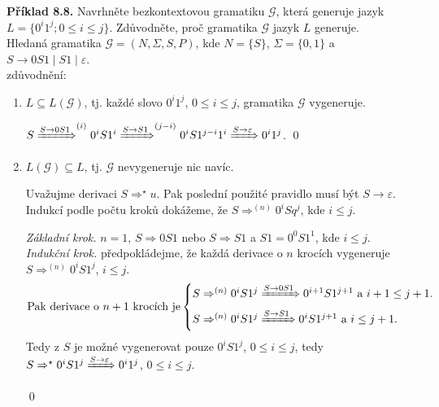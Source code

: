 \documentclass[11pt]{article}
\begin{document}
\newpage
\noindent
\textbf{Příklad 8.8.} Navrhněte bezkontextovou gramatiku $\mathcal{G}$, která generuje jazyk ${L = \{0^i1^j; 0 \leq i \leq j\}}$. Zdůvodněte, proč gramatika $\mathcal{G}$ jazyk $L$ generuje.\\

\noindent
Hledaná gramatika $\mathcal{G} = (N, \Sigma, S, P)$, kde $N=\{S\}$, $\Sigma = \{0,1\}$ a $S \rightarrow 0S1 \mid S1 \mid \varepsilon$.\\

\noindent
zdůvodnění:

\begin{enumerate}
    \item $L \subseteq L(\mathcal{G})$, tj. každé slovo $0^i 1^j$, $0 \leq i \leq j$, gramatika $\mathcal{G}$ vygeneruje.

        $S \xRightarrow{S \rightarrow 0S1}^{(i)} 0^i S 1^i \xRightarrow{S \rightarrow S1}^{(j-i)} 0^i S 1^{j-i} 1^i \xRightarrow{S \rightarrow \varepsilon} 0^i 1^j$. \qed
    \item $L(\mathcal{G}) \subseteq L$, tj. $\mathcal{G}$ nevygeneruje nic navíc.

        Uvažujme derivaci $S \Rightarrow^\star u$. Pak poslední použité pravidlo musí být $S \rightarrow \varepsilon$. Indukcí podle počtu kroků dokážeme, že $S \Rightarrow ^{(n)} 0^i S q^j$, kde $i \leq j$.

        \textit{Základní krok.} $n=1$, $S \Rightarrow 0S1$ nebo $S \Rightarrow S1$ a $S1 = 0^0 S 1^1$, kde $i \leq j$.\\
        \textit{Indukční krok.} předpokládejme, že každá derivace o $n$ krocích vygeneruje $S \Rightarrow^{(n)} 0^i S 1^j$, $i \leq j$.
        \noindent
        \[
            \text{Pak derivace o $n+1$ krocích je}
            \begin{cases*}
                S \Rightarrow^{(n)} 0^i S 1^j \xRightarrow{S \rightarrow 0S1} 0^{i+1} S 1^{j+1} \text{ a } i+1 \leq j+1. \\
                S \Rightarrow^{(n)} 0^i S 1^j \xRightarrow{S \rightarrow S1} 0^i S 1^{j+1} \text{ a } i \leq j+1. 
            \end{cases*}
        \]
        Tedy z $S$ je možné vygenerovat pouze $0^i S 1^j$, $0 \leq i \leq j$, tedy $S \Rightarrow^\star 0^i S 1^j \xRightarrow{S \rightarrow \varepsilon} 0^i 1^j$, $0 \leq i \leq j$.
        
        \qed
        
\end{enumerate}


 
\end{document}
